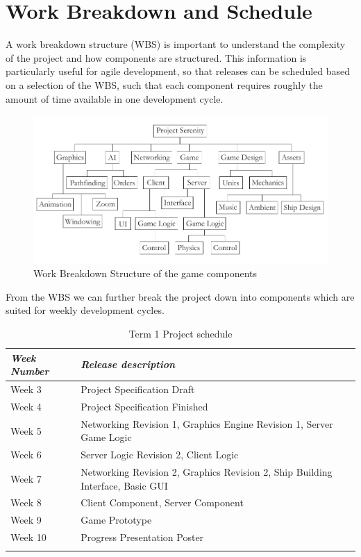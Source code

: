 \section{Work Breakdown and Schedule}
A work breakdown structure (WBS) is important to understand the complexity of the project and how components are structured. This information is particularly useful for agile development, so that releases can be scheduled based on a selection of the WBS,
 such that each component requires roughly the amount of time available in one development cycle.

\begin{figure}[h!]
	\includegraphics{res/wbs}
	\caption{Work Breakdown Structure of the game components}
\end{figure}

From the WBS we can further break the project down into components which are suited for weekly development cycles.

\begin{table}
	\begin{tabular}{l p{38em}}
		\toprule
		\emph{Week Number} & \emph{Release description} \\
		\midrule
		Week 3 & Project Specification Draft \\
		Week 4 & Project Specification Finished\\
		Week 5 & Networking Revision 1, Graphics Engine Revision 1, Server Game Logic\\
		Week 6 & Server Logic Revision 2, Client Logic\\
		Week 7 & Networking Revision 2, Graphics Revision 2, Ship Building Interface, Basic GUI\\
		Week 8 & Client Component, Server Component\\
		Week 9 & Game Prototype\\
		Week 10 & Progress Presentation Poster\\
		\bottomrule
		\caption{Term 1 Project schedule}
	\end{tabular}
	\label{tab:schedule}
\end{table}

